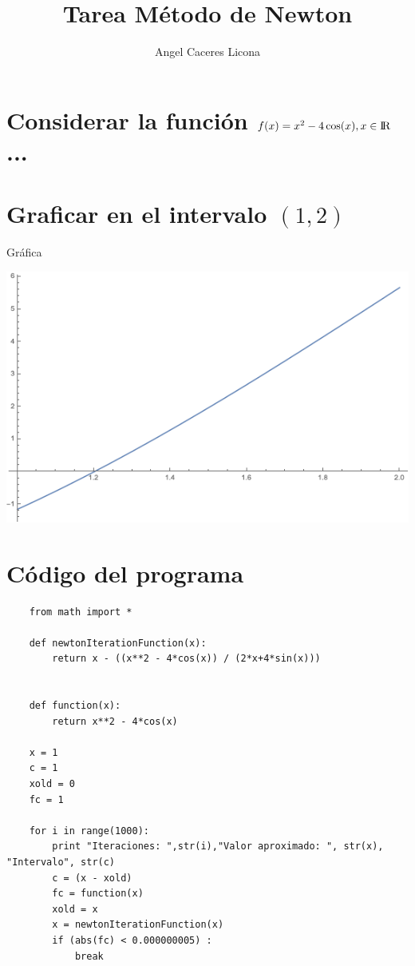 \documentclass{article}
\begin{document}
\title{Tarea Método de Newton}
\author{Angel Caceres Licona}

\maketitle

\section{Considerar la función $f(x) = x^2-4\cos(x) , x \in {\rm I\!R}$...}
\section{Graficar en el intervalo $(1,2)$}

Gráfica

\includegraphics[scale=0.4]{grafica1.png}


\section{Código del programa}

\begin{lstlisting}
    from math import *

    def newtonIterationFunction(x): 
        return x - ((x**2 - 4*cos(x)) / (2*x+4*sin(x)))
     
    
    def function(x): 
        return x**2 - 4*cos(x)
    
    x = 1
    c = 1
    xold = 0
    fc = 1
    
    for i in range(1000):
        print "Iteraciones: ",str(i),"Valor aproximado: ", str(x), "Intervalo", str(c)
        c = (x - xold)
        fc = function(x)
        xold = x
        x = newtonIterationFunction(x) 
        if (abs(fc) < 0.000000005) :
            break
\end{lstlisting}
\end{document}
